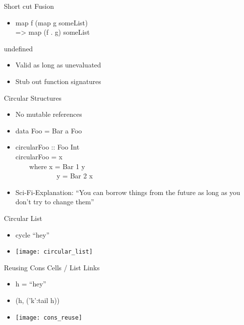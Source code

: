 \documentclass{beamer}                  %
\newcommand{\srule}{
	\rule{\textwidth}{1pt}\\
}
\newlength{\subsecwidth}
\newenvironment{slide}{
	\begin{frame} %
	\settowidth{\subsecwidth}{\insertsubsection} %
	\ifthenelse{\dimtest{\subsecwidth}{<}{1pt}}{ %
		\frametitle{\insertsection\\             %
		\vspace{-1ex}                            %
		\color{fore}\srule                       %
		\par                                     %
		\vspace{-3ex}                            %
		}
	}{                                           %
		\frametitle{\insertsection\ -- \insertsubsection\\ %
		\vspace{-1ex}                            %
		\color{fore}\srule                       %
		\par                                     %
		\vspace{-3ex}                            %
		}
	}
	\Large                                       %
}{
	\end{frame}
}
\begin{document}
\begin{slide}
  Short cut Fusion
  \begin{itemize}
    \item map f (map g someList)\\
      => map (f . g) someList
  \end{itemize}
\end{slide}

\begin{slide}
  undefined
  \begin{itemize}
    \item Valid as long as unevaluated
    \item Stub out function signatures
  \end{itemize}
\end{slide}

\begin{slide}
  Circular Structures
  \begin{itemize}
    \item No mutable references
    \item data Foo = Bar a Foo
    \item
      circularFoo :: Foo Int\\
      circularFoo = x\\
        ~~~~where x = Bar 1 y\\
        ~~~~~~~~~~~~y = Bar 2 x
      \item Sci-Fi-Explanation: ``You can borrow things from the future as long as you don't try to change them''
  \end{itemize}
\end{slide}

\begin{slide}
  Circular List
  \begin{itemize}
    \item cycle ``hey''
    \item \texttt{[image: circular\_list]}
  \end{itemize}
\end{slide}

\begin{slide}
  Reusing Cons Cells / List Links
  \begin{itemize}
    \item h = ``hey''\\
    \item (h, ('k':tail h))\\
    \item \texttt{[image: cons\_reuse]}
  \end{itemize}
\end{slide}
\end{document}

